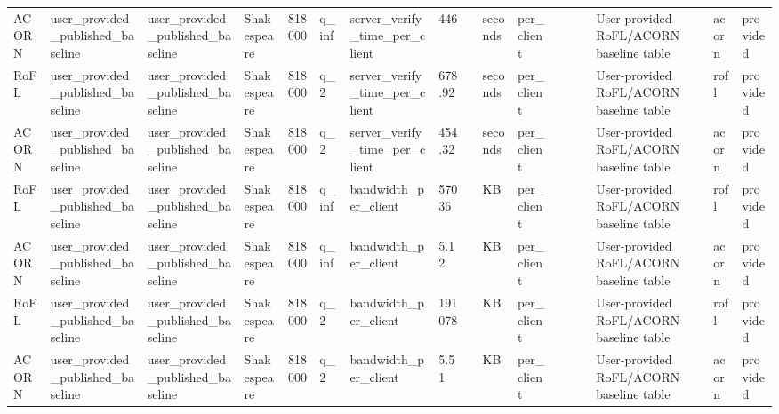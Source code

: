 \begin{table}[t]
\begin{tabular}{lllllllllllllllll}
ACORN & user\_provided\_published\_baseline & user\_provided\_published\_baseline & Shakespeare & 818000 & q\_inf & server\_verify\_time\_per\_client & 446 &  & seconds & per\_client &  &  &  & User-provided RoFL/ACORN baseline table & acorn & provided \\
RoFL & user\_provided\_published\_baseline & user\_provided\_published\_baseline & Shakespeare & 818000 & q\_2 & server\_verify\_time\_per\_client & 678.92 &  & seconds & per\_client &  &  &  & User-provided RoFL/ACORN baseline table & rofl & provided \\
ACORN & user\_provided\_published\_baseline & user\_provided\_published\_baseline & Shakespeare & 818000 & q\_2 & server\_verify\_time\_per\_client & 454.32 &  & seconds & per\_client &  &  &  & User-provided RoFL/ACORN baseline table & acorn & provided \\
RoFL & user\_provided\_published\_baseline & user\_provided\_published\_baseline & Shakespeare & 818000 & q\_inf & bandwidth\_per\_client & 57036 &  & KB & per\_client &  &  &  & User-provided RoFL/ACORN baseline table & rofl & provided \\
ACORN & user\_provided\_published\_baseline & user\_provided\_published\_baseline & Shakespeare & 818000 & q\_inf & bandwidth\_per\_client & 5.12 &  & KB & per\_client &  &  &  & User-provided RoFL/ACORN baseline table & acorn & provided \\
RoFL & user\_provided\_published\_baseline & user\_provided\_published\_baseline & Shakespeare & 818000 & q\_2 & bandwidth\_per\_client & 191078 &  & KB & per\_client &  &  &  & User-provided RoFL/ACORN baseline table & rofl & provided \\
ACORN & user\_provided\_published\_baseline & user\_provided\_published\_baseline & Shakespeare & 818000 & q\_2 & bandwidth\_per\_client & 5.51 &  & KB & per\_client &  &  &  & User-provided RoFL/ACORN baseline table & acorn & provided \\
\bottomrule
\end{tabular}
\end{table}
